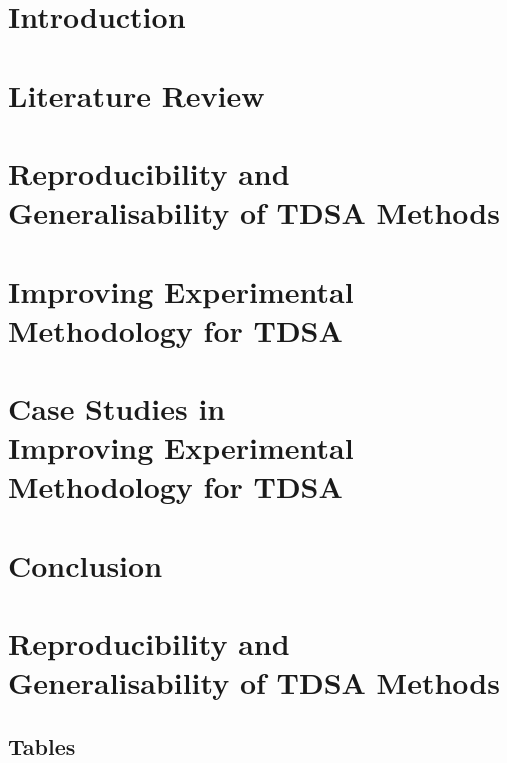 \documentclass[11pt]{report}
\begin{document}
\clearpage

\listoftables



\chapter{Introduction}
\label{chapter:introduction}

\chapter{Literature Review}
\label{chapter:lit_review}

\chapter{Reproducibility and Generalisability of TDSA Methods}
\label{chapter:reproducibility}

\chapter[Improving Experimental Methodology for TDSA]{Improving Experimental\\Methodology for TDSA}
\label{chapter:methodology}

\chapter[Case Studies in Improving Experimental Methodology for TDSA]{Case Studies in\\Improving Experimental\\Methodology for TDSA}
\label{chapter:case_study_methodology}

\chapter{Conclusion}
\label{chapter:conclusion}


\appendix
\chapter{Reproducibility and Generalisability of TDSA Methods}
\section{Tables}
\label{appendix_reproducibility_tables}

\end{document}
